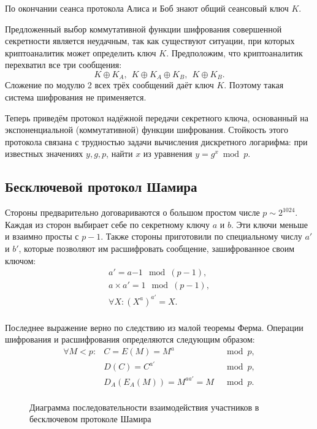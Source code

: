 По окончании сеанса протокола Алиса и Боб знают общий сеансовый ключ $K$.

Предложенный выбор коммутативной функции шифрования совершенной секретности является неудачным, так как существуют ситуации, при которых криптоаналитик может определить ключ $K$. Предположим, что криптоаналитик перехватил все три сообщения:
    \[ K \oplus K_A, ~~ K \oplus K_A \oplus K_B, ~~ K \oplus K_B. \]
Сложение по модулю 2 всех трёх сообщений даёт ключ $K$. Поэтому такая система шифрования не применяется.

Теперь приведём протокол надёжной передачи секретного ключа, основанный на экспоненциальной (коммутативной) функции шифрования. Стойкость этого протокола связана с трудностью задачи вычисления дискретного логарифма: при известных значениях $y, g, p$, найти $x$ из уравнения $y = g^x \bmod p$.

\subsection{Бесключевой протокол Шамира}\label{section-protocols-shamir}

Стороны предварительно договариваются о большом простом числе $p \sim 2^{1024}$. Каждая из сторон выбирает себе по секретному ключу $a$ и $b$. Эти ключи меньше и взаимно просты с $p-1$. Также стороны приготовили по специальному числу $a'$ и $b'$, которые позволяют им расшифровать сообщение, зашифрованное своим ключом:
\[\begin{array}{l}
a' = a{-1} \mod (p-1), \\
a \times a' = 1 \mod (p-1), \\
\forall X: (X^a)^{a'} = X. \\
\end{array}\]

Последнее выражение верно по следствию из малой теоремы Ферма. Операции шифрования и расшифрования определяются следующим образом:
\[\begin{array}{lll}
\forall M < p: & C = E( M ) = M^{a}            & \mod p, \\
               & D( C ) = C^{a'}               & \mod p, \\
               & D_A( E_A( M ) ) = M^{aa'} = M & \mod p. \\
\end{array}\]

\begin{figure}[thb]
	\centering
	\begin{sequencediagram}

	\end{sequencediagram}
	\caption{Диаграмма последовательности взаимодействия участников в бесключевом протоколе Шамира}
\end{figure}

